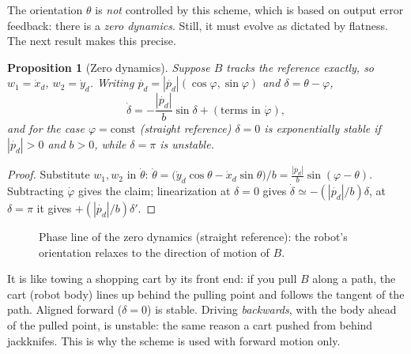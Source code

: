 \documentclass[11pt,a4paper]{article}
\def\bm#1{#1}%
\def\vect#1{#1}%
\newcommand{\vect}[1]{\bm{#1}}
\newcommand{\pd}{\vect{p}_d}
\theoremstyle{definition}
\theoremstyle{plain}
\newtheorem{proposition}[definition]{Proposition}
\theoremstyle{remark}
\begin{document}
The orientation $\theta$ is \emph{not} controlled by this scheme, which is based on output error feedback: there is a \emph{zero dynamics}. Still, it must evolve as dictated by flatness. The next result makes this precise.

\begin{proposition}[Zero dynamics]\label{prop:zerodyn}
Suppose $B$ tracks the reference exactly, so $w_1=\dot x_d$, $w_2=\dot y_d$. Writing $\dot{\pd}=|\dot{\pd}|(\cos\varphi,\sin\varphi)$ and $\delta=\theta-\varphi$,
\[
\dot\delta=-\frac{|\dot{\pd}|}{b}\sin\delta+(\text{terms in }\dot\varphi),
\]
and for the case $\varphi=\text{const}$ (straight reference) $\delta=0$ is exponentially stable if $|\dot{\pd}|>0$ and $b>0$, while $\delta=\pi$ is unstable.
\end{proposition}
\begin{proof}
Substitute $w_1,w_2$ in $\dot\theta$: $\dot\theta=\bigl(\dot y_d\cos\theta-\dot x_d\sin\theta\bigr)/b=\frac{|\dot{\pd}|}{b}\sin(\varphi-\theta)$. Subtracting $\dot\varphi$ gives the claim; linearization at $\delta=0$ gives $\dot\delta\simeq-(|\dot{\pd}|/b)\delta$, at $\delta=\pi$ it gives $+(|\dot{\pd}|/b)\delta'$.
\end{proof}

\begin{figure}[H]
\centering
{}
\caption{Phase line of the zero dynamics (straight reference): the robot's orientation relaxes to the direction of motion of $B$.}
\end{figure}

\begin{intuition}
It is like towing a shopping cart by its front end: if you pull $B$ along a path, the cart (robot body) lines up behind the pulling point and follows the tangent of the path. Aligned forward ($\delta=0$) is stable. Driving \emph{backwards}, with the body ahead of the pulled point, is unstable: the same reason a cart pushed from behind jackknifes. This is why the scheme is used with forward motion only.
\end{intuition}
\end{document}
